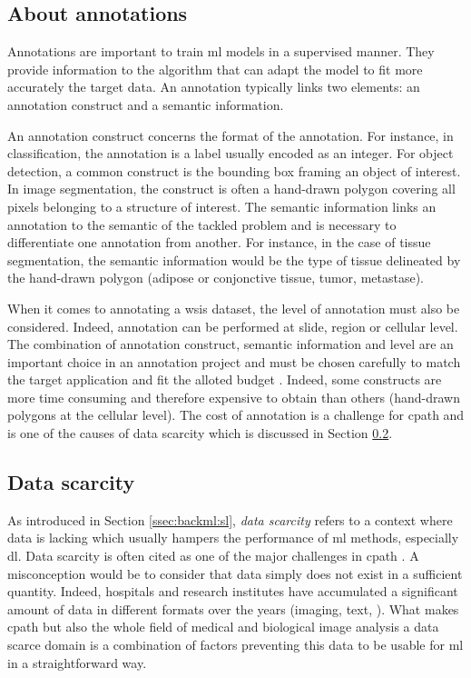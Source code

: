 \subsection{About annotations}
\label{ssec:backdp:conceptannotation}

Annotations are important to train \acrlong{ml} models in a supervised manner. They provide information to the algorithm that can adapt the model to fit more accurately the target data. An annotation typically links two elements: an annotation construct and a semantic information. 

An annotation construct concerns the format of the annotation. For instance, in classification, the annotation is a label usually encoded as an integer. For object detection, a common construct is the bounding box framing an object of interest. In image segmentation, the construct is often a hand-drawn polygon covering all pixels belonging to a structure of interest. The semantic information links an annotation to the semantic of the tackled problem and is necessary to differentiate one annotation from another. For instance, in the case of tissue segmentation, the semantic information would be the type of tissue delineated by the hand-drawn polygon (\eg adipose or conjonctive tissue, tumor, metastase).

When it comes to annotating a \acrshort{wsi}s dataset, the level of annotation must also be considered. Indeed, annotation can be performed at slide, region or cellular level. The combination of annotation construct, semantic information and level are an important choice in an annotation project and must be chosen carefully to match the target application and fit the alloted budget \parencite{wahab2022semantic}. Indeed, some constructs are more time consuming and therefore expensive to obtain than others (\eg hand-drawn polygons at the cellular level). The cost of annotation is a challenge for \acrlong{cpath} and is one of the causes of data scarcity which is discussed in Section \ref{ssec:backdp:datascarcity}. 

\subsection{Data scarcity}
\label{ssec:backdp:datascarcity}

As introduced in Section \ref{ssec:backml:sl}, \textit{data scarcity} refers to a context where data is lacking which usually hampers the performance of \acrlong{ml} methods, especially \acrlong{dl}. Data scarcity is often cited as one of the major challenges in \acrlong{cpath} \parencite{tizhoosh2018artificial,litjens2017survey,robertson2018digital,komura2018machine}. A misconception would be to consider that data simply does not exist in a sufficient quantity. Indeed, hospitals and research institutes have accumulated a significant amount of data in different formats over the years (imaging, text, \etc). What makes \acrlong{cpath} but also the whole field of medical and biological image analysis a data scarce domain is a combination of factors preventing this data to be usable for \acrlong{ml} in a straightforward way.

